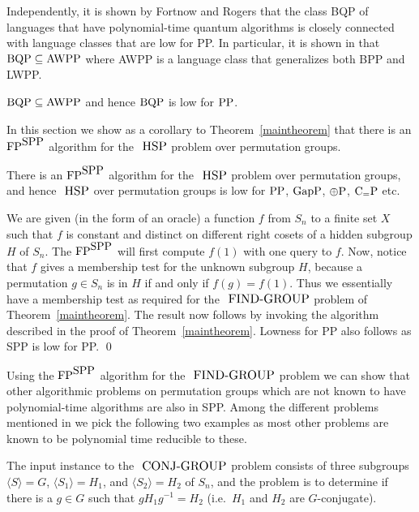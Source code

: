 \documentclass{elsart}
\newcommand{\PP}{\mbox{\rm PP}}
\newcommand{\GapP}{\mbox{\rm GapP}}
\newcommand{\FP}{\mbox{\rm FP}}
\newcommand{\ParityP}{\mbox{$\oplus$\rm P}}
\newcommand{\SPP}{\mbox{\rm SPP}}
\newcommand{\CeqP}{\mbox{\rm C$_=$P}}
\newcommand{\BQP}{\mbox{\rm BQP}}
\newcommand{\AWPP}{\mbox{\rm AWPP}}
\newcommand{\FINDGROUP}{\mbox{\small\rm FIND{-}GROUP}}
\newcommand{\HSP}{\mbox{\small\rm HSP}}
\newcommand{\CONJGP}{\mbox{\small\rm CONJ{-}GROUP}}
\renewcommand{\angle}[1]{\langle #1\rangle}
\begin{document}
Independently, it is shown by Fortnow and Rogers \cite{fortnow98complexity} 
that the class BQP of languages that have polynomial-time quantum algorithms is
closely connected with language classes that are low for PP. In
particular, it is shown in \cite{fortnow98complexity} that $\BQP\subseteq\AWPP$
where AWPP is a language class that generalizes both BPP and LWPP.

\begin{thm}{\rm\cite{fortnow98complexity}}
$\BQP\subseteq\AWPP$ and hence $\BQP$ is low for $\PP$.
\end{thm}

In this section we show as a corollary to Theorem~\ref{maintheorem}
that there is an $\FP^{\SPP}$ algorithm for the $\HSP$ problem over
permutation groups.

\begin{thm}
  There is an $\FP^{\SPP}$ algorithm for the $\HSP$ problem over
  permutation groups, and hence $\HSP$ over permutation groups is low
  for $\PP$, $\GapP$, $\ParityP$, $\CeqP$ etc.
\end{thm}

\begin{pf}
  We are given (in the form of an oracle) a function $f$ from $S_n$ to
  a finite set $X$ such that $f$ is constant and distinct on different
  right cosets of a hidden subgroup $H$ of $S_n$. The $\FP^{\SPP}$
  will first compute $f(1)$ with one query to $f$. Now, notice that
  $f$ gives a membership test for the unknown subgroup $H$, because a
  permutation $g\in S_n$ is in $H$ if and only if $f(g)=f(1)$. Thus we
  essentially have a membership test as required for the $\FINDGROUP$
  problem of Theorem~\ref{maintheorem}. The result now follows by
  invoking the algorithm described in the proof of
  Theorem~\ref{maintheorem}. Lowness for PP also follows as SPP is low
  for PP. \qed
\end{pf}

Using the $\FP^{\SPP}$ algorithm for the $\FINDGROUP$ problem we can
show that other algorithmic problems on permutation groups 
\cite{luks93permutation} which are not known to have polynomial-time algorithms
are also in SPP. Among the different problems mentioned in
\cite{luks93permutation} we pick the following two examples as most other 
problems are known to be polynomial time reducible to these.

The input instance to the $\CONJGP$ problem consists of three
subgroups $\angle{S}=G$, $\angle{S_1}=H_1$, and $\angle{S_2}=H_2$ of
$S_n$, and the problem is to determine if there is a $g\in G$ such
that $gH_1g^{-1}=H_2$ (i.e.\ $H_1$ and $H_2$ are $G$-conjugate).
\end{document}
